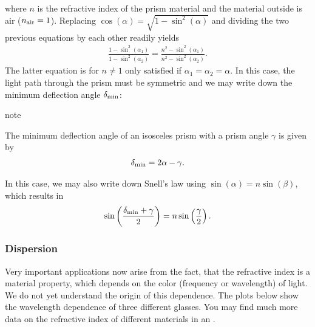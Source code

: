 \documentclass[letterpaper,10pt,english]{sphinxmanual}
\begin{document}
where \(n\) is the refractive index of the prism material and the material outside is air (\(n_{\rm air}=1\)). Replacing \(\cos(\alpha)=\sqrt{1-\sin^2(\alpha)}\) and dividing the two previous equations by each other readily yields
\begin{equation*}
\begin{split}\frac{1-\sin^2(\alpha_1)}{1-\sin^2(\alpha_2)}=\frac{n^2-\sin^2(\alpha_1)}{n^2-\sin^2(\alpha_2)}.\end{split}
\end{equation*}
The latter equation is for \(n\neq 1\) only satisfied if \(\alpha_1=\alpha_2=\alpha\). In this case, the light path through the prism must be symmetric and we may write down the minimum deflection angle \(\delta_{\rm min}\):

\begin{sphinxadmonition}{note}{}\unskip
{}

The minimum deflection angle of an isosceles prism with a prism angle \(\gamma\) is given by
\begin{equation*}
\begin{split}\delta_{\rm min}=2\alpha-\gamma.\end{split}
\end{equation*}\end{sphinxadmonition}

In this case, we may also write down Snell’s law using \(\sin(\alpha)=n\sin(\beta)\), which results in
\begin{equation*}
\begin{split}\sin \left ( \frac{\delta_{\rm min}+\gamma}{2}\right )=n\sin\left (\frac{\gamma}{2}\right).\end{split}
\end{equation*}

\subsubsection{Dispersion}
\label{\detokenize{notebooks/L3/Optical Elements:Dispersion}}
Very important applications now arise from the fact, that the refractive index is a material property, which depends on the color (frequency or wavelength) of light. We do not yet understand the origin of this dependence. The plots below show the wavelength dependence of three different glasses. You may find much more data on the refractive index of different materials in an .
\end{document}
